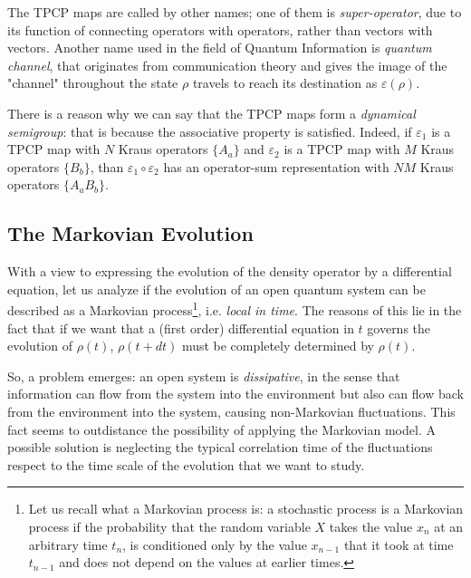 The TPCP maps are called by other names; one of them is \emph{super-operator}, due to its function of connecting operators with operators, rather than vectors with vectors. Another name used in the field of Quantum Information is \emph{quantum channel}, that originates from communication theory and gives the image of the "channel" throughout the state $\rho$ travels to reach its destination as $\varepsilon(\rho)$.

There is a reason why we can say that the TPCP maps form a \emph{dynamical semigroup}: that is because the associative property is satisfied. Indeed, if $\varepsilon_1$ is a TPCP map with $N$ Kraus operators $\{A_a\}$ and $\varepsilon_2$ is a TPCP map with $M$ Kraus operators $\{B_b\}$, than $\varepsilon_1 \circ \varepsilon_2$ has an operator-sum representation with $NM$ Kraus operators $\{A_aB_b\}$.

\subsection{The Markovian Evolution}
With a view to expressing the evolution of the density operator by a differential equation,  let us analyze if the evolution of an open quantum system can be described as a Markovian process\footnote{Let us recall what a Markovian process is: a stochastic process is a Markovian process if the probability that the random variable $X$ takes the value $x_n$ at an arbitrary time $t_n$, is conditioned only by the value $x_{n-1}$ that it took at time $t_{n-1}$ and does not depend on the values at earlier times.}, i.e. \emph{local in time}. The reasons of this lie in the fact that if we want that a (first order) differential equation in $t$ governs the evolution of $\rho(t)$, $\rho(t+dt)$ must be completely determined by $\rho(t)$.

So, a problem emerges: an open system is \emph{dissipative}, in the sense that information can flow from the system into the environment but also can flow back from the environment into the system, causing non-Markovian fluctuations. This fact seems to outdistance the possibility of applying the Markovian model.  A possible solution is neglecting the typical correlation time of the fluctuations respect to the time scale of the evolution that we want to study.

